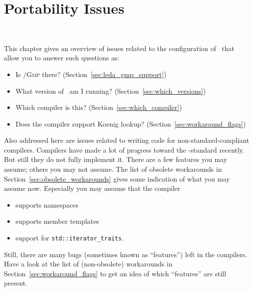 
\chapter{Portability Issues}
\label{chap:portability}
 \\

This chapter gives an overview of issues related to the
configuration of \cgal\ that allow you to answer such questions as:
\begin{itemize}
\item Is \leda/\textsc{Gmp} there? (Section~\ref{sec:leda_gmp_support})
\item What version of \cgal\ am I running? (Section~\ref{sec:which_versions})
\item Which compiler is this? (Section~\ref{sec:which_compiler})
\item Does the compiler support Koenig lookup? (Section~\ref{sec:workaround_flags})
\end{itemize}

Also addressed here are issues related to writing code for 
non-standard-compliant compilers.  Compilers have made a lot of progress toward 
the \CC-standard recently.  But still they do not fully implement it. There 
are a few features you may assume; others you may not assume. The list of 
obsolete workarounds in Section~\ref{sec:obsolete_workarounds} gives some 
indication of what you may assume now.  Especially you may assume that the 
compiler
\begin{itemize}
\item supports namespaces
\item supports member templates
\item support for \texttt{std::iterator\_traits}.
\end{itemize}
Still, there are many bugs (sometimes known as ``features'') left in the 
compilers.  Have a look at the list of (non-obsolete) workarounds in 
Section~\ref{sec:workaround_flags} to get an idea of which ``features'' are
still present.  

